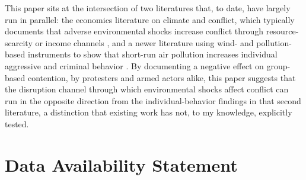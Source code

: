 \documentclass[12pt]{article}
\begin{document}
This paper sits at the intersection of two literatures that, to date, have largely run in parallel: the economics literature on climate and conflict, which typically documents that adverse environmental shocks increase conflict through resource-scarcity or income channels \citep{hsiang2013quantifying,burkehsiangmiguel2015}, and a newer literature using wind- and pollution-based instruments to show that short-run air pollution increases individual aggressive and criminal behavior \citep{herrnstadt2021,bondyrothsager2020,burkhardt2019}. By documenting a negative effect on group-based contention, by protesters and armed actors alike, this paper suggests that the disruption channel through which environmental shocks affect conflict can run in the opposite direction from the individual-behavior findings in that second literature, a distinction that existing work has not, to my knowledge, explicitly tested.

\section*{Data Availability Statement}
\end{document}
